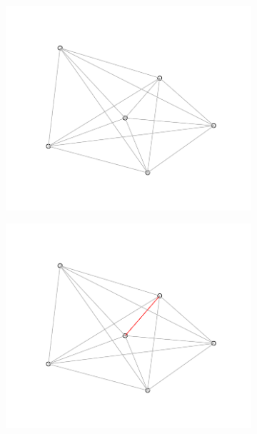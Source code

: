 \begin{figure}[h]
    \centering %
\begin{subfigure}{0.25\textwidth}
  \includegraphics[width=\linewidth]{./pictures/4/triangulation_1.pdf}
  \label{fig:3-triangulation_1}
\end{subfigure}\hfil %
\begin{subfigure}{0.25\textwidth}
  \includegraphics[width=\linewidth]{./pictures/4/triangulation_2.pdf}
  \label{fig:3-triangulation_2}
\end{subfigure}\hfil %

\end{figure}
